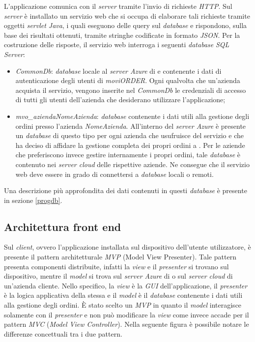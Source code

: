 L'applicazione comunica con il \textit{server} tramite l'invio di richieste \textit{HTTP}. Sul \textit{server} è installato un servizio web che si occupa di elaborare tali richieste tramite oggetti \textit{servlet Java}, i quali eseguono delle query sul \textit{database} e rispondono, sulla base dei risultati ottenuti, tramite stringhe codificate in formato \textit{JSON}. Per la costruzione delle risposte, il servizio web interroga i seguenti \textit{database} \textit{SQL Server}:
\begin{itemize}
	\item \textit{CommonDb}: \textit{database} locale al \textit{server Azure} di \visione{} e contenente i dati di autenticazione degli utenti di \textit{moviORDER}. Ogni qualvolta che un'azienda acquista il servizio, vengono inserite nel \textit{CommonDb} le credenziali di accesso di tutti gli utenti dell'azienda che desiderano utilizzare l'applicazione;
	\item \textit{mvo\_aziendaNomeAzienda}: \textit{database} contenente i dati utili alla gestione degli ordini presso l'azienda \textit{NomeAzienda}. All'interno del \textit{server Azure} è presente un \textit{database} di questo tipo per ogni azienda che usufruisce del servizio e che ha deciso di affidare la gestione completa dei propri ordini a \visione{}. Per le aziende che preferiscono invece gestire internamente i propri ordini, tale \textit{database} è contenuto nei \textit{server cloud} delle rispettive aziende. Ne consegue che il servizio web deve essere in grado di connettersi a \textit{database} locali o remoti.
\end{itemize}
Una descrizione più approfondita dei dati contenuti in questi \textit{database} è presente in sezione \ref{progdb}.

\subsection{Architettura front end}

Sul \textit{client}, ovvero l'applicazione installata sul dispositivo dell'utente utilizzatore, è presente il pattern architetturale \textit{MVP} (Model View Presenter). Tale pattern presenta componenti distribuite, infatti la \textit{view} e il \textit{presenter} si trovano sul dispositivo, mentre il \textit{model} si trova sul \textit{server Azure} di \visione{} o sul \textit{server cloud} di un'azienda cliente. Nello specifico, la \textit{view} è la \textit{GUI} dell'applicazione, il \textit{presenter} è la logica applicativa della stessa e il \textit{model} è il \textit{database} contenente i dati utili alla gestione degli ordini. È stato scelto un \textit{MVP} in quanto il \textit{model} interagisce solamente con il \textit{presenter} e non può modificare la \textit{view} come invece accade per il pattern \textit{MVC} (\textit{Model View Controller}). Nella seguente figura è possibile notare le differenze concettuali tra i due pattern.

